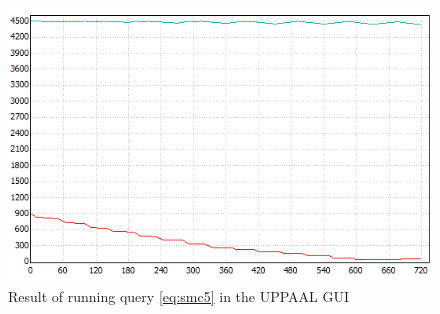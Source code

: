\begin{figure}[!h]
	\centering
	\includegraphics[scale=0.8]{graphics/simAB1.png}
	\caption{Result of running query \ref{eq:smc5} in the UPPAAL GUI}
	\label{fig:simAB}
\end{figure}
